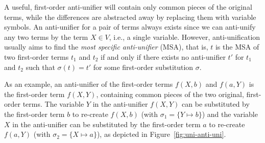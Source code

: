 A useful, first-order anti-unifier will contain only common pieces of the original terms, while the differences are abstracted away by replacing them with variable symbols. An anti-unifier for a pair of terms always exists since we can anti-unify any two terms by the term $X\in V$, i.e., a single variable. However, anti-unification usually aims to find the \emph{most specific anti-unifier} (MSA), that is, $t$ is the MSA of two first-order terms $t_1$ and $t_2$ if and only if there exists no anti-unifier $t'$ for $t_1$ and $t_2$ such that $\sigma(t)=t'$ for some first-order substitution $\sigma$.

As an example, an anti-unifier of the first-order terms $f(X,b)$ and $f(a,Y)$ is the first-order term $f(X,Y)$, containing common pieces of the two original, first-order terms. The variable $Y$ in the anti-unifier $f(X,Y)$ can be substituted by the first-order term $b$ to re-create $f(X,b)$ (with $\sigma_1 = \{Y\mapsto b\}$) and the variable $X$ in the anti-unifier can be substituted by the first-order term $a$ to re-create $f(a,Y)$
(with $\sigma_2 = \{X\mapsto a\}$), as depicted in Figure~\ref{fig:uni-anti-uni}.

